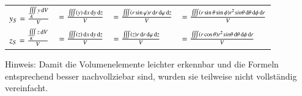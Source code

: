{\begin{tabular}{|l|l|l|l|}
        \bigstrut[tb]$ y_{S} = \frac{\iiint\limits_{K} y \mathop{} \! \mathrm{d} V}{V} $ & 
        $ = \frac{\iiint (y) \mathop{} \! \mathrm{d} x \mathop{} \! \mathrm{d} y \mathop{} \! \mathrm{d} z}{V} $ &
        $ = \frac{\iiint (r \sin \varphi) r \mathop{} \! \mathrm{d} r \mathop{} \! \mathrm{d} \varphi \mathop{} \! \mathrm{d} z}{V} $ &
        $ = \frac{\iiint (r \sin \theta \sin \phi) r^2 sin \theta \mathop{} \! \mathrm{d} \theta \mathop{} \! \mathrm{d} \phi \mathop{} \! \mathrm{d} r}{V} $ \\

        \bigstrut[tb]$ z_{S} = \frac{\iiint\limits_{K} z \mathop{} \! \mathrm{d} V}{V} $ & 
        $ = \frac{\iiint (z) \mathop{} \! \mathrm{d} x \mathop{} \! \mathrm{d} y \mathop{} \! \mathrm{d} z}{V} $ &
        $ = \frac{\iiint (z) r \mathop{} \! \mathrm{d} r \mathop{} \! \mathrm{d} \varphi \mathop{} \! \mathrm{d} z}{V} $ &
        $ = \frac{\iiint (r \cos \theta) r^2 sin \theta \mathop{} \! \mathrm{d} \theta \mathop{} \! \mathrm{d} \phi \mathop{} \! \mathrm{d} r}{V} $ \\
        \hline
    \end{tabular}
}

\smallskip
Hinweis: Damit die Volumenelemente leichter erkennbar und die Formeln entsprechend besser nachvollziebar sind, wurden sie teilweise nicht vollständig vereinfacht.





        
